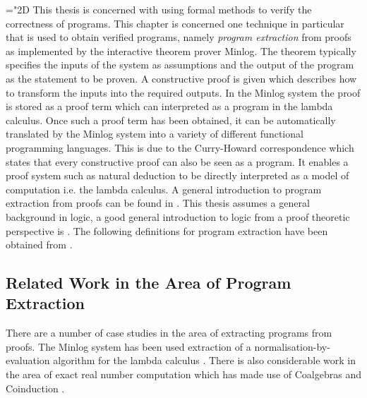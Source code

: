 \mathchardef\mhyphen="2D
\newcommand{\mathass}[1]{\mathrm{[}#1 {]}}
This thesis is concerned with using formal methods to verify the correctness of programs. This chapter is concerned one technique in particular that is used to obtain verified programs, namely \emph{program extraction} from proofs as implemented by the interactive theorem prover Minlog. The theorem typically specifies the inputs of the system as assumptions and the output of the program as the statement to be proven. A constructive proof is given which describes how to transform the inputs into the required outputs. In the Minlog system the proof is stored as a proof term which can interpreted as a program in the lambda calculus. Once such a proof term has been obtained, it can be automatically translated by the Minlog system into a variety of different functional programming languages. This is due to the Curry-Howard correspondence \cite{HC34, HC58, WH80} which states that every constructive proof can also be seen as a program. It enables a proof system such as natural deduction to be directly interpreted as a model of computation i.e. the lambda calculus.  A general introduction to program extraction from proofs can be found in \cite{SW11}. This thesis assumes a general background in logic, a good general introduction to logic from a proof theoretic perspective is \cite{HandBookProof}. The following definitions for program extraction have been obtained from \cite{HS14}.

\subsection*{Related Work in the Area of Program Extraction}
There are a number of case studies in the area of extracting programs from proofs. The Minlog system has been used extraction of a normalisation-by-evaluation algorithm for the lambda calculus \cite{UB06}. There is also considerable work in the area of exact real number computation \cite{UB08} which has made use of Coalgebras and Coinduction \cite{UB11}. 


